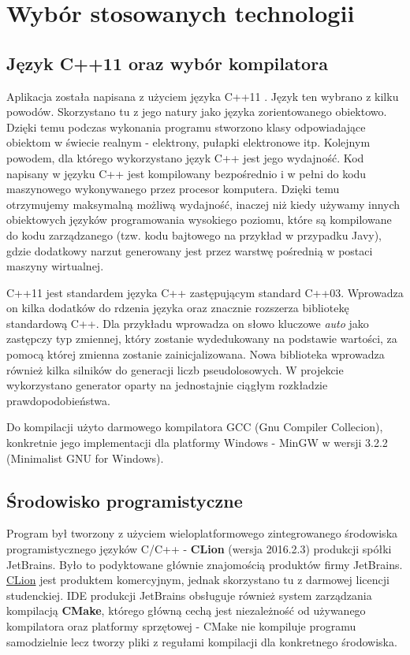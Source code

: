 \chapter{Wybór stosowanych technologii}
\section{Język C++11 oraz wybór kompilatora}
Aplikacja została napisana z użyciem języka C++11 \cite{c++}. Język ten
wybrano z kilku powodów. Skorzystano tu z jego natury jako języka zorientowanego obiektowo. Dzięki temu podczas wykonania programu stworzono klasy odpowiadające obiektom w świecie realnym - elektrony, pułapki elektronowe itp.
Kolejnym powodem, dla którego wykorzystano język C++ jest jego wydajność. Kod napisany
w języku C++ jest kompilowany bezpośrednio i w pełni do kodu maszynowego  wykonywanego przez procesor komputera. Dzięki temu
otrzymujemy maksymalną możliwą wydajność, inaczej niż kiedy używamy innych
obiektowych języków programowania wysokiego poziomu, które są kompilowane do kodu
zarządzanego (tzw. kodu bajtowego na przykład w przypadku Javy), gdzie dodatkowy narzut
generowany jest przez warstwę pośrednią w postaci maszyny wirtualnej. 

C++11 jest standardem języka C++ zastępującym standard C++03. Wprowadza on kilka dodatków do rdzenia języka oraz znacznie rozszerza bibliotekę standardową C++. Dla przykładu wprowadza on słowo kluczowe \textit{auto} jako zastępczy typ zmiennej, który zostanie wydedukowany na podstawie wartości, za pomocą której zmienna zostanie zainicjalizowana. Nowa biblioteka wprowadza również kilka silników do generacji liczb pseudolosowych. W projekcie wykorzystano generator oparty na jednostajnie ciągłym rozkładzie prawdopodobieństwa.

Do kompilacji użyto darmowego kompilatora GCC (Gnu Compiler Collecion), konkretnie jego implementacji dla platformy Windows - MinGW w wersji 3.2.2 (Minimalist GNU for Windows).

\section{Środowisko programistyczne}

Program był tworzony z użyciem wieloplatformowego zintegrowanego środowiska programistycznego języków C/C++ - \textbf{CLion} (wersja 2016.2.3) produkcji spółki JetBrains. Było to podyktowane głównie znajomością produktów firmy JetBrains. \href{https://www.jetbrains.com/clion/}{CLion} jest produktem komercyjnym, jednak skorzystano tu z darmowej licencji studenckiej. IDE produkcji JetBrains obsługuje również 	system zarządzania kompilacją \textbf{CMake}, którego główną cechą jest niezależność od używanego kompilatora oraz platformy sprzętowej - CMake nie kompiluje programu samodzielnie lecz tworzy pliki z regułami kompilacji dla konkretnego środowiska.

